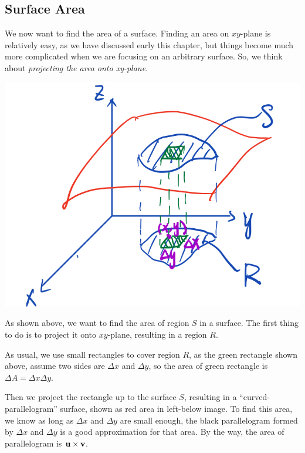 \documentclass[11pt, a4paper]{MATH2023}
\begin{document}
\begin{spacing}{1.3}
    \newpage
    \section{Surface Area}
    
    We now want to find the area of a surface. Finding an area on $xy$-plane is relatively easy, as we 
    have discussed early this chapter, but things become much more complicated when we are focusing
    on an arbitrary surface. So, we think about {\it projecting the area onto xy-plane}.

    \begin{center}
        \includegraphics[scale=0.24]{images/Ch14-surface-area.jpeg}
    \end{center}

    As shown above, we want to find the area of region $S$ in a surface. The first thing to do 
    is to project it onto $xy$-plane, resulting in a region $R$.

    As usual, we use small rectangles to cover region $R$, as the green rectangle shown above,
    assume two sides are $\Delta x$ and $\Delta y$, so the area of green rectangle is $\Delta A
    =\Delta x\Delta y$.

    Then we project the rectangle up to the surface $S$, resulting in a ``curved-parallelogram''
    surface, shown as red area in left-below image. To find this area, we know as long as 
    $\Delta x$ and $\Delta y$ are small enough, the black parallelogram formed by $\Delta x$ and $\Delta y$
    is a good approximation for that area. By the way, the area of parallelogram is ${\bf u}\times {\bf v}$.


\end{spacing}
\end{document}
